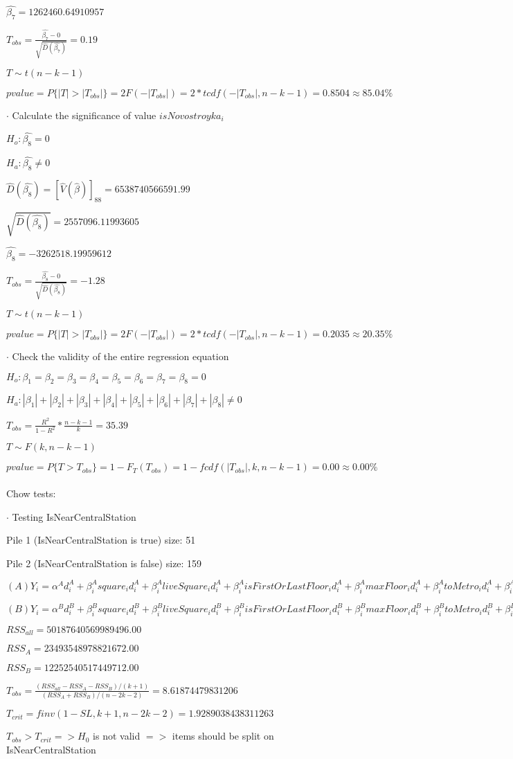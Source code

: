 \documentclass{article}
\begin{document}
$\hat{\beta_7}=1262460.64910957$

$T_{obs}=\frac{\hat{\beta_7}-0}{\sqrt{\hat{D}(\hat{\beta_7})}}=0.19$

$T\sim t(n-k-1)$

$pvalue=P\{|T|>|T_{obs}|\}=2F(-|T_{obs}|)=2*tcdf(-|T_{obs}|, n-k-1)=0.8504\approx85.04\%$

$\cdot$ Calculate the significance of value $isNovostroyka_i$

$H_o: \hat{\beta_8}=0$

$H_a: \hat{\beta_8}\neq0$

$\hat{D}(\hat{\beta_8})=[\hat{V}(\hat{\beta})]_{8 8}=6538740566591.99$

$\sqrt{\hat{D}(\hat{\beta_8})}=2557096.11993605$

$\hat{\beta_8}=-3262518.19959612$

$T_{obs}=\frac{\hat{\beta_8}-0}{\sqrt{\hat{D}(\hat{\beta_8})}}=-1.28$

$T\sim t(n-k-1)$

$pvalue=P\{|T|>|T_{obs}|\}=2F(-|T_{obs}|)=2*tcdf(-|T_{obs}|, n-k-1)=0.2035\approx20.35\%$

$\cdot$ Check the validity of the entire regression equation

$H_o: \beta_1=\beta_2=\beta_3=\beta_4=\beta_5=\beta_6=\beta_7=\beta_8=0$

$H_a: |\beta_1|+|\beta_2|+|\beta_3|+|\beta_4|+|\beta_5|+|\beta_6|+|\beta_7|+|\beta_8|\neq0$

$T_{obs}=\frac{R^2}{1-R^2}*\frac{n-k-1}{k}=35.39$

$T\sim F(k,n-k-1)$

$pvalue=P\{T>T_{obs}\}=1-F_T(T_{obs})=1-fcdf(|T_{obs}|,k,n-k-1)=0.00\approx0.00\%$
\\\\Chow tests:

$\cdot$ Testing IsNearCentralStation

Pile 1 (IsNearCentralStation is true) size: 51

Pile 2 (IsNearCentralStation is false) size: 159

$(A)Y_i=\alpha^Ad^A_i+\beta^A_isquare_id^A_i+\beta^A_iliveSquare_id^A_i+\beta^A_iisFirstOrLastFloor_id^A_i+\beta^A_imaxFloor_id^A_i+\beta^A_itoMetro_id^A_i+\beta^A_iyearOfConstructuon_id^A_i+\beta^A_ihasElevator_id^A_i+\beta^A_iisNovostroyka_id^A_i+\epsilon_i$

$(B)Y_i=\alpha^Bd^B_i+\beta^B_isquare_id^B_i+\beta^B_iliveSquare_id^B_i+\beta^B_iisFirstOrLastFloor_id^B_i+\beta^B_imaxFloor_id^B_i+\beta^B_itoMetro_id^B_i+\beta^B_iyearOfConstructuon_id^B_i+\beta^B_ihasElevator_id^B_i+\beta^B_iisNovostroyka_id^B_i+\epsilon_i$

$RSS_{all}=50187640569989496.00$

$RSS_A=23493548978821672.00$

$RSS_B=12252540517449712.00$

$T_{obs}=\frac{(RSS_{all}-RSS_A-RSS_B)/(k+1)}{(RSS_A+RSS_B)/(n - 2k - 2)}=8.61874479831206$

$T_{crit}=finv(1 - SL, k + 1, n - 2k - 2)=1.9289038438311263$

$T_{obs}>T_{crit}=>H_0$ is not valid $=>$ items should be split on IsNearCentralStation
\end{document}
